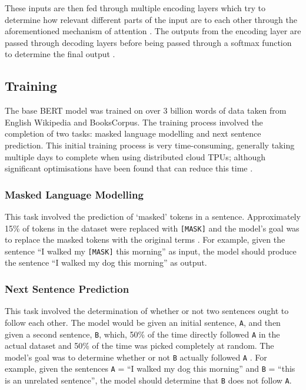 These inputs are then fed through multiple encoding layers which try to determine how relevant different parts of the input are to each other through the aforementioned mechanism of attention \cite{AlammarTransformer}. The outputs from the encoding layer are passed through decoding layers before being passed through a softmax function to determine the final output \cite{Devlin2018_BERT}.

\subsection{Training}

The base BERT model was trained on over 3 billion words of data taken from English Wikipedia and BooksCorpus. The training process involved the completion of two tasks: masked language modelling and next sentence prediction. This initial training process is very time-consuming, generally taking multiple days to complete when using distributed cloud TPUs; although significant optimisations have been found that can reduce this time \cite{you2019large}.

\subsubsection{Masked Language Modelling}

This task involved the prediction of `masked' tokens in a sentence. Approximately 15\% of tokens in the dataset were replaced with \texttt{[MASK]} and the model's goal was to replace the masked tokens with the original terms \cite{Devlin2018_BERT}. For example, given the sentence ``I walked my \texttt{[MASK]} this morning'' as input, the model should produce the sentence ``I walked my dog this morning'' as output.

\subsubsection{Next Sentence Prediction}

This task involved the determination of whether or not two sentences ought to follow each other. The model would be given an initial sentence, \texttt{A}, and then given a second sentence, \texttt{B}, which, 50\% of the time directly followed \texttt{A} in the actual dataset and 50\% of the time was picked completely at random. The model's goal was to determine whether or not \texttt{B} actually followed \texttt{A} \cite{Devlin2018_BERT}. For example, given the sentences \texttt{A} = ``I walked my dog this morning'' and \texttt{B} = ``this is an unrelated sentence'', the model should determine that \texttt{B} does not follow \texttt{A}.

